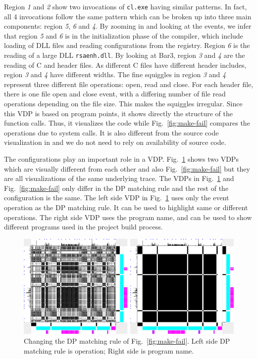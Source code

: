 Region {\em 1} and {\em 2} show two invocations of {\tt cl.exe}
having similar patterns.
In fact, all 4 invocations follow the same pattern which can be broken
up into three main components:
region {\em 5}, {\em 6} and {\em 4}.
By zooming in and looking at the events, we infer that
region {\em 5} and {\em 6} is in the initialization phase of the compiler, which include
loading of DLL files and reading configurations from the registry.
Region {\em 6} is the reading of a large DLL {\tt rsaenh.dll}.
By looking at Bar3,
region {\em 3} and {\em 4} are the reading of C and header files.
As different C files have different header includes,
region {\em 3} and {\em 4} have different widths.
The fine squiggles in region {\em 3} and {\em 4} represent
three different file operations: open, read and close.
For each header file, there is one file open and close event,
with a differing number of file read operations depending
on the file size.
This makes the squiggles irregular.
Since this VDP is based on program points, it shows directly the 
structure of the function calls. Thus, it visualizes
the code while Fig.~\ref{fig:make-fail} compares the operations
due to system calls.
It is also different from the source code visualization in \cite{lefebvre2009tralfamadore}
and we do not need to rely on availability of source code.

The configurations play an important role in a VDP.
Fig.~\ref{fig:make-matching} shows two VDPs 
which are visually different from each other and also Fig.~\ref{fig:make-fail}
but they are all visualizations of the same underlying trace.
The VDPs in Fig.~\ref{fig:make-matching} and 
Fig.~\ref{fig:make-fail} only differ in the DP matching rule and
the rest of the configuration is the same.
The left side VDP in Fig.~\ref{fig:make-matching} uses only the event 
operation as the DP matching rule.
It can be used to highlight same or different operations.
The right side VDP uses the program name, and can be used to
show different programs used in the project build process.

\begin{figure}[htb]
\begin{center}
\includegraphics[width=1.0\columnwidth]{lviz/make-matching.png}
\caption{Changing the DP matching rule of Fig.~\ref{fig:make-fail}.
Left side DP matching rule is operation; Right side is program name.
}
\label{fig:make-matching}
\end{center}
\end{figure}

